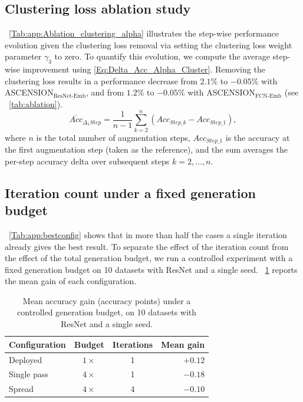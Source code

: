 \subsection{Clustering loss ablation study}\label{app:HPSA:clusterL}\label{app:loss_weights}
\tablename~\ref{Tab:app:Ablation_clustering_alpha} illustrates the step-wise performance evolution given the clustering loss removal via setting the clustering loss weight parameter $\gamma_3$ to zero. To quantify this evolution, we compute the average step-wise improvement using \eqref{Eq:Delta_Acc_Alpha_Cluster}. Removing the clustering loss results in a performance decrease from $2.1\%$ to $-0.05\%$ with ASCENSION$_{\text{ResNet-Emb}}$, and from $1.2\%$ to $-0.05\%$ with ASCENSION$_{\text{FCN-Emb}}$ (see \tablename~\ref{tab:ablation}).
\begin{equation}\label{Eq:Delta_Acc_Alpha_Cluster}
\overline{Acc}_{\Delta_1 Step} = \frac{1}{n - 1} \sum_{k = 2}^{n} \left( Acc_{Step\_k} - Acc_{Step\_1}\right),
\end{equation}
where $n$ is the total number of augmentation steps, $Acc_{Step\_1}$ is the accuracy at the first augmentation step (taken as the reference), and the sum averages the per-step accuracy delta over subsequent steps $k = 2, \ldots, n$.





















\subsection{Iteration count under a fixed generation budget}
\label{app:budget-matched}

\tablename~\ref{Tab:app:bestconfig}
shows that in more than half the cases a single iteration already gives
the best result. To separate the effect of the iteration count from the
effect of the total generation budget, we run a controlled experiment
with a fixed generation budget on 10 datasets with ResNet and a single
seed. \tablename~\ref{tab:budget-matched} reports the mean gain of each
configuration.

\begin{table}[!htb]
\centering
\small
\caption{Mean accuracy gain (accuracy points) under a controlled
generation budget, on 10 datasets with ResNet and a single seed.}
\label{tab:budget-matched}
\begin{tabular}{lccr}
\toprule
\textbf{Configuration} & \textbf{Budget} & \textbf{Iterations} & \textbf{Mean gain} \\
\midrule
Deployed    & $1\times$ & 1 & $+0.12$ \\
Single pass & $4\times$ & 1 & $-0.18$ \\
Spread      & $4\times$ & 4 & $-0.10$ \\
\bottomrule
\end{tabular}
\end{table}

